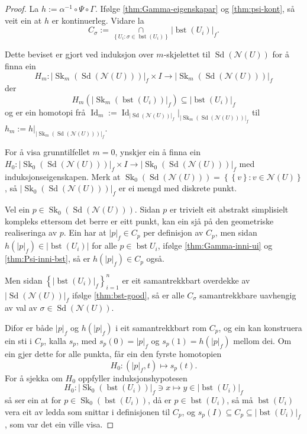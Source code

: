 \documentclass[a4paper, 12pt, norsk]{article}
\theoremstyle{plain}
\theoremstyle{definition}
\newcommand{\Nc}{\mathcal{N}}
\newcommand{\intersect}{ \mathop{\cap}\limits }
\newcommand{\gr}[1]{ \lvert #1 \rvert } %
\newcommand{\set}[1]{ \left\{ #1 \right\} } %
\DeclareMathOperator{\Sd}{Sd} %
\DeclareMathOperator{\bst}{bst} %
\DeclareMathOperator{\Sk}{Sk} %
\DeclareMathOperator{\Id}{Id} %
\begin{document}
\begin{proof}
	La \( h := \alpha^{-1} \circ \Psi \circ \Gamma \). Ifølge \autoref{thm:Gamma-eigenskapar} og \autoref{thm:psi-kont}, så veit ein at \( h \) er kontinuerleg. Vidare la 
	\[ 
		C_\sigma := \intersect_{\set{ U_i : \sigma \in \bst(U_i) }} \gr{\bst(U_i)}_f.
	\]

	Dette beviset er gjort ved induksjon over \( m \)-skjelettet til \( \Sd(\Nc(U)) \) for å finna ein 
	\[ 
		H_m : \gr{\Sk_m(\Sd(\Nc(U)))}_f \times I \to \gr{\Sk_m(\Sd(\Nc(U)))}_f
	\]
	der 
	\[
		H_m(\gr{\Sk_m(\bst(U_i))}_f) \subseteq \gr{\bst(U_i)}_f
	\]
	og er ein homotopi frå \( \Id_m := \Id_{\gr{\Sd(\Nc(U))}_f}|_{\gr{\Sk_m(\Sd(\Nc(U)))}_f} \) til \( h_m := h|_{\gr{\Sk_m(\Sd(\Nc(U)))}_f} \).

	For å visa grunntilfellet \( m = 0 \), ynskjer ein å finna ein \( H_0: \gr{\Sk_0(\Sd(\Nc(U)))}_f \times I \to \gr{\Sk_0(\Sd(\Nc(U)))}_f \) med induksjonseigenskapen. Merk at \( \Sk_0(\Sd(\Nc(U))) = \set{\set{v} : v \in \Nc(U)} \), så \( \gr{\Sk_0(\Sd(\Nc(U)))}_f \) er ei mengd med diskrete punkt.

	Vel ein \( p \in \Sk_0(\Sd(\Nc(U))) \). Sidan \( p \) er trivielt eit abstrakt simplisielt kompleks ettersom det berre er eitt punkt, kan ein sjå på den geometriske realiseringa av \( p \). Ein har at \( \gr{p}_f \in C_p \) per definisjon av \( C_p \), men sidan \( h(\gr{p}_f) \in \gr{\bst(U_i)} \) for alle \( p \in \bst{U_i} \), ifølge \autoref{thm:Gamma-inni-ui} og \autoref{thm:Psi-inni-bst}, så er \( h(\gr{p}_f) \in C_p \) også.

	Men sidan \( \set{\gr{\bst(U_i)}_f}_{i = 1}^{n} \) er eit samantrekkbart overdekke av \( \gr{\Sd(\Nc(U))}_f \) ifølge \autoref{thm:bst-good}, så er alle \( C_\sigma \) samantrekkbare uavhengig av val av \( \sigma \in \Sd(\Nc(U)) \).

	Difor er både \( \gr{p}_f \) og \( h(\gr{p}_f) \) i eit samantrekkbart rom \( C_p \), og ein kan konstruera ein sti i \( C_p \), kalla \( s_p \), med \( s_p(0) = \gr{p}_f \) og \( s_p(1) = h(\gr{p}_f) \) mellom dei. Om ein gjer dette for alle punkta, får ein den fyrste homotopien
	\[
		H_0 : (\gr{p}_f, t) \mapsto s_p(t).
	\]
	For å sjekka om \( H_0 \) oppfyller induksjonshypotesen
	\[
		H_0: \gr{\Sk_0(\bst(U_i))}_f \ni x \mapsto y \in \gr{\bst(U_i)}_f
	\]
	så ser ein at for \( p \in \Sk_0(\bst(U_i)) \), då er \( p \in \bst(U_i) \), så må \( \bst(U_i) \) vera eit av ledda som snittar i definisjonen til \( C_p \), og \( s_p(I) \subseteq C_p \subseteq \gr{\bst(U_i)}_f \), som var det ein ville visa.


\end{proof}
\end{document}
